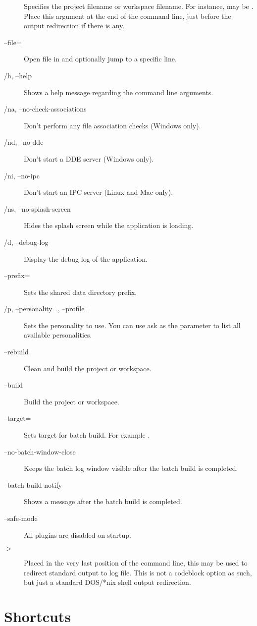 \begin{description}
\item[] Specifies the project  filename or workspace  filename. For instance,  may be . Place this argument at the end of the command line, just before the output redirection if there is any.
\item[--file=] Open file in \codeblocks and optionally jump to a specific line.
\item[/h, --help] Shows a help message regarding the command line arguments.
\item[/na, --no-check-associations] Don't perform any file association checks (Windows only).
\item[/nd, --no-dde] Don't start a DDE server (Windows only).
\item[/ni, --no-ipc] Don't start an IPC server (Linux and Mac only).
\item[/ns, --no-splash-screen] Hides the splash screen while the application is loading.
\item[/d, --debug-log] Display the debug log of the application.
\item[--prefix=] Sets the shared data directory prefix.
\item[/p, --personality=, --profile=] Sets the personality to use. You can use ask as the parameter to list all available personalities.
\item[--rebuild] Clean and build the project or workspace.
\item[--build] Build the project or workspace.
\item[--target=] Sets target for batch build. For example .
\item[--no-batch-window-close] Keeps the batch log window visible after the batch build is completed.
\item[--batch-build-notify] Shows a message after the batch build is completed.
\item[--safe-mode] All plugins are disabled on startup.
\item[$>$ ] Placed in the very last position of the command line, this may be used to redirect standard output to log file. This is not a codeblock option as such, but just a standard DOS/*nix shell output redirection.
\end{description}

\section{Shortcuts}

